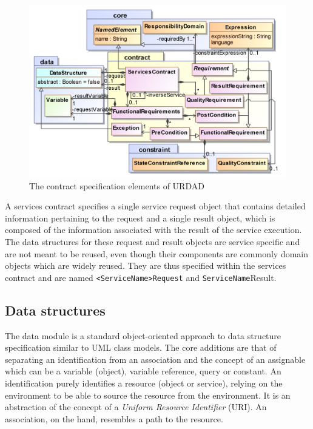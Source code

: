 \begin{figure}
  \centering
  \includegraphics{contract}
  \caption{The contract specification elements of URDAD}
  \label{fig:metamodel}
\end{figure}

A services contract specifies a single service request object that contains detailed information pertaining to the request and a single result object, which is composed of the information associated with the result of the service execution. The data structures for these request and result objects are service specific and are not meant to be reused, even though their components are commonly domain objects which are widely reused. They are thus specified within the services contract and are named \verb+<ServiceName>Request+ and \verb+ServiceName+Result.



\subsection{Data structures}

The data module is a standard object-oriented approach to data structure specification similar to UML class models. The core additions are that of separating an identification from an association and the concept of an assignable which can be a variable (object), variable reference, query or constant. An identification purely identifies a resource (object or service), relying on the environment to be able to source the resource from the environment. It is an abstraction of the concept of a \emph{Uniform Resource Identifier} (URI). An association, on the hand, resembles a path to the resource.

